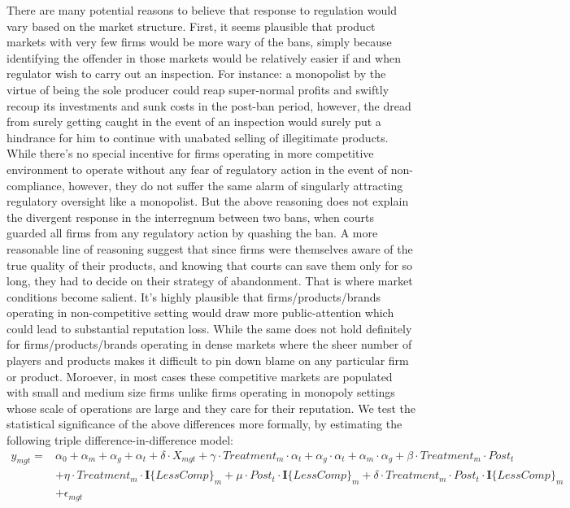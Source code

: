 \documentclass[AER]{AEA}
\theoremstyle{theorem}
\begin{document}
There are many potential reasons to believe that response to regulation would vary based on the market structure. First, it seems plausible that product markets with very few firms would be more wary of the bans, simply because identifying the offender in those markets would be relatively easier if and when regulator wish to carry out an inspection. For instance: a monopolist by the virtue of being the sole producer could reap super-normal profits and swiftly recoup its investments and sunk costs in the post-ban period, however, the dread from surely getting caught in the event of an inspection would surely put a hindrance for him to continue with unabated selling of illegitimate products. While there's no special incentive for firms operating in more competitive environment  to operate without any fear of regulatory action in the event of non-compliance, however, they do not suffer the same alarm of singularly attracting regulatory oversight like a monopolist. But the above reasoning does not explain the divergent response in the interregnum between two bans, when courts guarded all firms from any regulatory action by quashing the ban. A more reasonable line of reasoning suggest that since firms were themselves aware of the true quality of their products, and knowing that courts can save them only for so long, they had to decide on their strategy of abandonment. That is where market conditions become salient. It's highly plausible that firms/products/brands operating in non-competitive setting would draw more public-attention which could lead to substantial reputation loss. While the same does not hold definitely for firms/products/brands operating in dense markets where the sheer number of players and products makes it difficult to pin down blame on any particular firm or product. Moroever, in most cases these competitive markets are populated with small and medium size firms unlike firms operating in monopoly settings whose scale of operations are large and they care for their reputation. We test the statistical significance of the above differences more formally, by estimating the following triple difference-in-difference model:
\begin{equation}\label{Eq_4}
	\begin{aligned}
		y_{mgt} =& \alpha_{0} + \alpha_{m}  + \alpha_{g} + \alpha_{t} +  \delta \cdot X_{mgt} +  \gamma \cdot Treatment_{m} \cdot \alpha_{t} + \alpha_{g}\cdot\alpha_{t} + \alpha_{m} \cdot \alpha_{g} + \beta \cdot Treatment_{m} \cdot Post_{t} \\
		&	 + \eta \cdot Treatment_{m} \cdot \mathbf{I}\{Less Comp\}_{m} + \mu \cdot Post_{t} \cdot \mathbf{I}\{Less Comp\}_{m} + \delta \cdot Treatment_{m} \cdot Post_{t} \cdot \mathbf{I}\{Less Comp\}_{m} \\
		& + \epsilon_{mgt}
	\end{aligned}
\end{equation}
\end{document}
